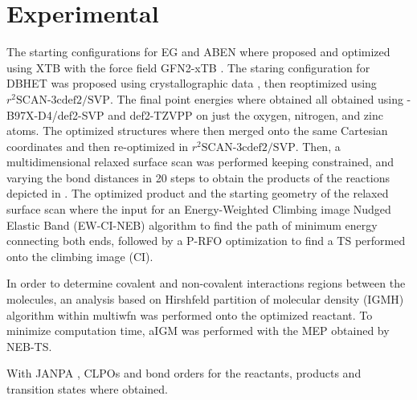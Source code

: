 \section{Experimental}
\label{sec:experimental}

The starting configurations for EG and ABEN where proposed and optimized using XTB \cite{Bannwarth2021} with the force field GFN2-xTB \cite{Bannwarth2019}. The staring configuration for DBHET was proposed using crystallographic data \cite{Daubeny1954}, then reoptimized using $r^2\textrm{SCAN-3c}\textrm{def2/SVP}$. The final point energies where obtained all obtained using \chemomega-B97X-D4/def2-SVP and def2-TZVPP on just the oxygen, nitrogen, and  zinc atoms.
The optimized structures where then merged onto the same Cartesian coordinates and then re-optimized in $r^2\textrm{SCAN-3c}\textrm{def2/SVP}$. Then, a multidimensional relaxed surface scan was performed keeping constrained, and varying the bond distances in 20 steps to obtain the products of the reactions depicted in . The optimized product and the starting geometry of the relaxed surface scan where the input for an Energy-Weighted Climbing image Nudged Elastic Band (EW-CI-NEB) \cite{Asgeirsson2021} algorithm to find the path of minimum energy connecting both ends, followed by a P-RFO optimization to find a TS performed onto the climbing image (CI).

In order to determine covalent and non-covalent interactions regions between the molecules, an analysis based on Hirshfeld partition of molecular density (IGMH) algorithm within multiwfn was performed \cite{Lu2021} onto the optimized reactant. To minimize computation time, aIGM was performed with the MEP obtained by NEB-TS.

With JANPA \cite{Nikolaienko2014}, CLPOs and bond orders for the reactants, products and transition states where obtained.